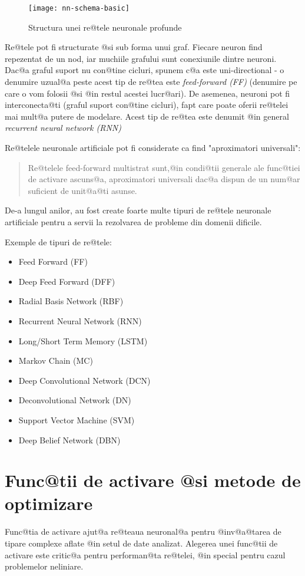 \begin{figure}[h]
	\centering
	\texttt{[image: nn-schema-basic]}
	\caption{Structura unei re@tele neuronale profunde}
	\label{nn:schema-basic}
\end{figure}


Re@tele pot fi structurate @si sub forma unui graf. Fiecare neuron find repezentat de un nod, iar muchiile grafului sunt conexiunile dintre neuroni. Dac@a graful suport nu con@tine cicluri, spunem c@a este uni-directional - o denumire uzual@a peste acest tip de re@tea este {\sl feed-forward (FF)} (denumire pe care o vom folosii @si @in restul acestei lucr@ari). De asemenea, neuroni pot fi interconecta@ti (graful suport con@tine cicluri), fapt care poate oferii re@telei mai mult@a putere de modelare. Acest tip de re@tea este denumit @in general {\sl recurrent neural network (RNN)}

Re@telele neuronale artificiale pot fi considerate ca find "aproximatori universali"\cite{hornik-nn}: 
\begin{quotation}
	Re@telele feed-forward multistrat sunt,@in condi@tii generale ale func@tiei de activare ascuns@a, aproximatori universali dac@a dispun de un num@ar suficient de unit@a@ti asunse.
\end{quotation}

De-a lungul anilor, au fost create foarte multe tipuri de re@tele neuronale artificiale pentru a servii la rezolvarea de probleme din domenii dificile.

Exemple de tipuri de re@tele:

\begin{itemize}
	\item Feed Forward (FF)
	\item Deep Feed Forward (DFF)
	\item Radial Basis Network (RBF)
	\item Recurrent Neural Network (RNN)
	\item Long/Short Term Memory (LSTM)
	\item Markov Chain (MC)
	\item Deep Convolutional Network (DCN)
	\item Deconvolutional Network (DN)
	\item Support Vector Machine (SVM)
	\item Deep Belief Network (DBN)
\end{itemize}



\section{Func@tii de activare @si metode de optimizare}
Func@tia de activare ajut@a re@teaua neuronal@a pentru @inv@a@tarea de tipare complexe aflate @in setul de date analizat. Alegerea unei func@tii de activare este critic@a pentru performan@ta re@telei, @in special pentru cazul problemelor neliniare.

